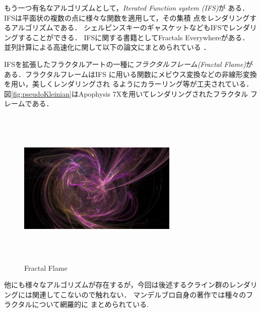 もう一つ有名なアルゴリズムとして，{\it Iterated Function system (IFS)}が
ある．
IFSは平面状の複数の点に様々な関数を適用して，その集積
点をレンダリングするアルゴリズムである．
シェルピンスキーのギャスケットなどもIFSでレンダリングすることができる．
IFSに関する書籍としてFractals Everywhere\cite{fractalsEverywhere}がある．
並列計算による高速化に関して以下の論文にまとめられている
\cite{highPerformanceIFS}\cite{GPUIFS}．

IFSを拡張したフラクタルアートの一種に\emph{フラクタルフレーム}{\it(Fractal
Flame)}\cite{fractalFlame}がある．フラクタルフレームはIFS
に用いる関数にメビウス変換などの非線形変換を用い，美しくレンダリングされ
るようにカラーリング等が工夫されている．
図\ref{fig:pseudoKleinian}はApophysis 7Xを用いてレンダリングされたフラクタル
フレームである．

\begin{figure}[htbp]
  \begin{center}
   \includegraphics[width=3in, height=3in, keepaspectratio]{../img/fractal/fractalFlame.pdf}
   \caption{Fractal Flame}
   \label{fig:fractalFlame}
  \end{center}
\end{figure}

他にも様々なアルゴリズムが存在するが，今回は後述するクライン群のレンダリ
ングには関連してこないので触れない．
マンデルブロ自身の著作\cite{fractal}では種々のフラクタルについて網羅的に
まとめられている.
